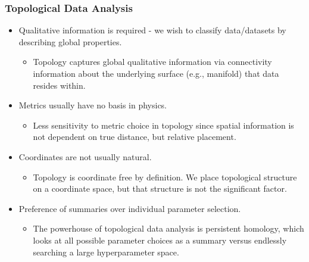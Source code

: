 		\begin{frame}
		\frametitle{Topological Data Analysis}
		\begin{itemize}
			\item Qualitative information is required - we wish to classify data/datasets by describing global properties.
				\begin{itemize}
					\item Topology captures global qualitative information via connectivity information about
					the underlying surface (e.g., manifold) that data resides within.
				\end{itemize}
			\item Metrics usually have no basis in physics.
				\begin{itemize}
					\item Less sensitivity to metric choice in topology since spatial information is not dependent on true distance, but relative placement.
				\end{itemize}
			\item Coordinates are not usually natural.
				\begin{itemize}
					\item Topology is coordinate free by definition. We place topological structure on a coordinate space, but that structure is not the significant factor.
				\end{itemize}
			\item Preference of summaries over individual parameter selection.
				\begin{itemize}
					\item The powerhouse of topological data analysis is persistent homology, which looks at all possible parameter choices
					as a summary versus endlessly searching a large hyperparameter space.
				\end{itemize}
		\end{itemize}
		\end{frame}
